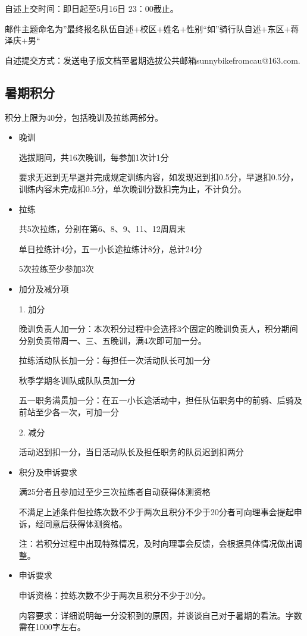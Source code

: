 \documentclass{ctexbook}
\begin{document}
自述上交时间：即日起至5月16日 23：00截止。

邮件主题命名为''最终报名队伍自述+校区+姓名+性别``如''骑行队自述+东区+蒋泽庆+男``

自述提交方式：发送电子版文档至暑期选拔公共邮箱sunnybikefromcau@163.com.

\subsection{暑期积分}

积分上限为40分，包括晚训及拉练两部分。

\begin{itemize}
    \item 晚训

 选拔期间，共16次晚训，每参加1次计1分

 要求无迟到无早退并完成规定训练内容，如发现迟到扣0.5分，早退扣0.5分，训练内容未完成扣0.5分，单次晚训分数扣完为止，不计负分。

\item 拉练

 共5次拉练，分别在第6、8、9、11、12周周末

 单日拉练计4分，五一小长途拉练计8分，总计24分

 5次拉练至少参加3次

\item 加分及减分项

1. 加分

 晚训负责人加一分：本次积分过程中会选择3个固定的晚训负责人，积分期间分别负责带周一、三、五晚训，满4次即可加一分。

 拉练活动队长加一分：每担任一次活动队长可加一分

 秋季学期冬训队成队队员加一分

 五一职务满贯加一分：在五一小长途活动中，担任队伍职务中的前骑、后骑及前站至少各一次，可加一分

2. 减分

 活动迟到扣一分，当日活动队长及担任职务的队员迟到扣两分

\item 积分及申诉要求

满25分者且参加过至少三次拉练者自动获得体测资格

不满足上述条件但拉练次数不少于两次且积分不少于20分者可向理事会提起申诉，经同意后获得体测资格。

注：若积分过程中出现特殊情况，及时向理事会反馈，会根据具体情况做出调整。

\item 申诉要求

申诉资格：拉练次数不少于两次且积分不少于20分。

内容要求：详细说明每一分没积到的原因，并谈谈自己对于暑期的看法。字数需在1000字左右。

\end{itemize}
\end{document}
